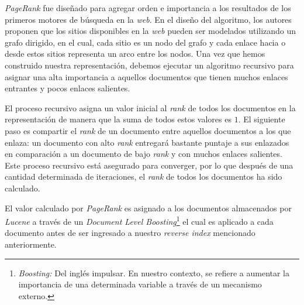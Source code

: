 \textit{PageRank} fue diseñado para agregar orden e importancia a los resultados de los primeros motores de búsqueda en la \textit{web}. En el diseño del algoritmo, los autores proponen que los sitios disponibles en la \textit{web} pueden ser modelados utilizando un grafo dirigido, en el cual, cada sitio es un nodo del grafo y cada enlace hacia o desde estos sitios representa un arco entre los nodos. Una vez que hemos construido nuestra representación, debemos ejecutar un algoritmo recursivo para asignar una alta importancia a aquellos documentos que tienen muchos enlaces entrantes y pocos enlaces salientes.

El proceso recursivo asigna un valor inicial al \textit{rank} de todos los documentos en la representación de manera que la suma de todos estos valores es $1$. El siguiente paso es compartir el \textit{rank} de un documento entre aquellos documentos a los que enlaza: un documento con alto \textit{rank} entregará bastante puntaje a sus enlazados en comparación a un documento de bajo \textit{rank} y con muchos enlaces salientes. Este proceso recursivo está asegurado para converger, por lo que después de una cantidad determinada de iteraciones, el \textit{rank} de todos los documentos ha sido calculado.

El valor calculado por \textit{PageRank} es asignado a los documentos almacenados por \textit{Lucene} a través de un \textit{Document Level Boosting}\footnote{\textit{Boosting:} Del inglés impulsar. En nuestro contexto, se refiere a aumentar la importancia de una determinada variable a través de un mecanismo externo.} el cual es aplicado a cada documento antes de ser ingresado a nuestro \textit{reverse index} mencionado anteriormente.

% 
% 
% 
